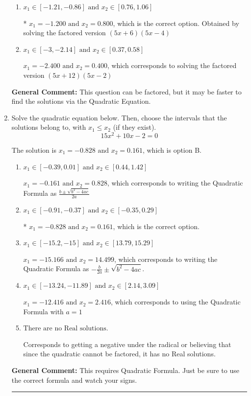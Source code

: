 \documentclass{extbook}[14pt]
\newcommand{\litem}[1]{\item #1

\rule{\textwidth}{0.4pt}}
\begin{document}
\begin{enumerate}
{\begin{enumerate}[label=\Alph*.]
$x_1 = -6.000 \text{ and } x_2 = 0.160$, which corresponds to solving the factored version $(x + 6)(25x -4)$
\item \( x_1 \in [-1.21, -0.86] \text{ and } x_2 \in [0.76, 1.06] \)

* $x_1 = -1.200 \text{ and } x_2 = 0.800$, which is the correct option. Obtained by solving the factored version $(5x + 6)(5x -4)$
\item \( x_1 \in [-3, -2.14] \text{ and } x_2 \in [0.37, 0.58] \)

$x_1 = -2.400 \text{ and } x_2 = 0.400$, which corresponds to solving the factored version $(5x + 12)(5x -2)$
\end{enumerate}

\textbf{General Comment:} This question can be factored, but it may be faster to find the solutions via the Quadratic Equation.
}
\litem{
Solve the quadratic equation below. Then, choose the intervals that the solutions belong to, with $x_1 \leq x_2$ (if they exist).
\[ 15x^{2} +10 x -2 = 0 \]

The solution is \( x_1 = -0.828 \text{ and } x_2 = 0.161 \), which is option B.\begin{enumerate}[label=\Alph*.]
\item \( x_1 \in [-0.39, 0.01] \text{ and } x_2 \in [0.44, 1.42] \)

 $x_1 = -0.161 \text{ and } x_2 = 0.828$, which corresponds to writing the Quadratic Formula as $\frac{b \pm \sqrt{b^2 - 4ac}}{2a}$
\item \( x_1 \in [-0.91, -0.37] \text{ and } x_2 \in [-0.35, 0.29] \)

* $x_1 = -0.828 \text{ and } x_2 = 0.161$, which is the correct option.
\item \( x_1 \in [-15.2, -15] \text{ and } x_2 \in [13.79, 15.29] \)

 $x_1 = -15.166 \text{ and } x_2 = 14.499$, which corresponds to writing the Quadratic Formula as $-\frac{b}{2a} \pm \sqrt{b^2 - 4ac}$.
\item \( x_1 \in [-13.24, -11.89] \text{ and } x_2 \in [2.14, 3.09] \)

 $x_1 = -12.416 \text{ and } x_2 = 2.416$, which corresponds to using the Quadratic Formula with $a=1$
\item \( \text{There are no Real solutions.} \)

Corresponds to getting a negative under the radical or believing that since the quadratic cannot be factored, it has no Real solutions.
\end{enumerate}

\textbf{General Comment:} This requires Quadratic Formula. Just be sure to use the correct formula and watch your signs.
}
\end{enumerate}
\end{document}
